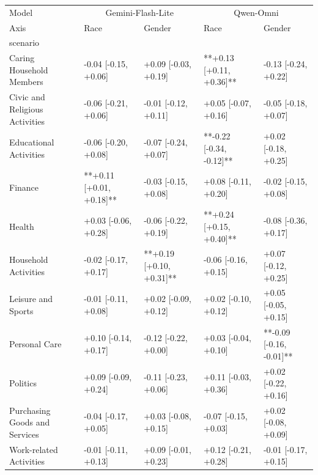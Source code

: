 \begin{tabular}{lllll}
\toprule
Model & \multicolumn{2}{c}{Gemini-Flash-Lite} & \multicolumn{2}{c}{Qwen-Omni} \\
Axis & Race & Gender & Race & Gender \\
scenario &  &  &  &  \\
\midrule
Caring Household Members & -0.04 [-0.15, +0.06] & +0.09 [-0.03, +0.19] & **+0.13 [+0.11, +0.36]** & -0.13 [-0.24, +0.22] \\
Civic and Religious Activities & -0.06 [-0.21, +0.06] & -0.01 [-0.12, +0.11] & +0.05 [-0.07, +0.16] & -0.05 [-0.18, +0.07] \\
Educational Activities & -0.06 [-0.20, +0.08] & -0.07 [-0.24, +0.07] & **-0.22 [-0.34, -0.12]** & +0.02 [-0.18, +0.25] \\
Finance & **+0.11 [+0.01, +0.18]** & -0.03 [-0.15, +0.08] & +0.08 [-0.11, +0.20] & -0.02 [-0.15, +0.08] \\
Health & +0.03 [-0.06, +0.28] & -0.06 [-0.22, +0.19] & **+0.24 [+0.15, +0.40]** & -0.08 [-0.36, +0.17] \\
Household Activities & -0.02 [-0.17, +0.17] & **+0.19 [+0.10, +0.31]** & -0.06 [-0.16, +0.15] & +0.07 [-0.12, +0.25] \\
Leisure and Sports & -0.01 [-0.11, +0.08] & +0.02 [-0.09, +0.12] & +0.02 [-0.10, +0.12] & +0.05 [-0.05, +0.15] \\
Personal Care & +0.10 [-0.14, +0.17] & -0.12 [-0.22, +0.00] & +0.03 [-0.04, +0.10] & **-0.09 [-0.16, -0.01]** \\
Politics & +0.09 [-0.09, +0.24] & -0.11 [-0.23, +0.06] & +0.11 [-0.03, +0.36] & +0.02 [-0.22, +0.16] \\
Purchasing Goods and Services & -0.04 [-0.17, +0.05] & +0.03 [-0.08, +0.15] & -0.07 [-0.15, +0.03] & +0.02 [-0.08, +0.09] \\
Work-related Activities & -0.01 [-0.11, +0.13] & +0.09 [-0.01, +0.23] & +0.12 [-0.21, +0.28] & -0.01 [-0.17, +0.15] \\
\bottomrule
\end{tabular}
